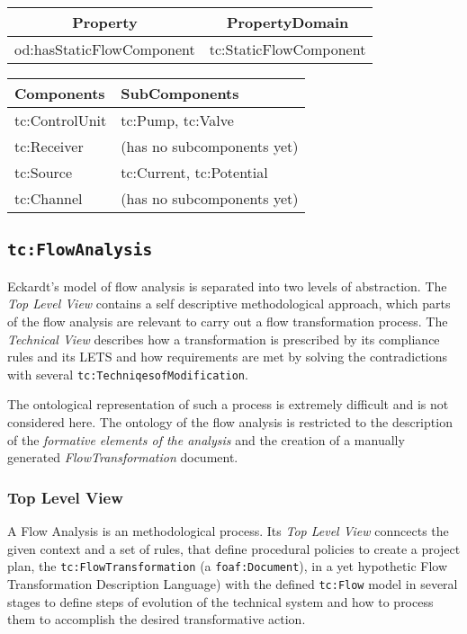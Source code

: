 \documentclass[a4paper,11pt]{article}
\begin{document}
\begin{itemize}
    \begin{center}
        \begin{tabular}{|c|c|}\hline
            Property & PropertyDomain \\\hline
            od:hasStaticFlowComponent & tc:StaticFlowComponent \\\hline 
        \end{tabular}
        \end{center}
    
        \begin{center}
        \begin{tabular}{|l|p{10cm}|}\hline
            Components & SubComponents \\\hline
            tc:ControlUnit & tc:Pump, tc:Valve \\
            tc:Receiver & (has no subcomponents yet) \\
            tc:Source & tc:Current, tc:Potential \\
            tc:Channel & (has no subcomponents yet)\\\hline 
        \end{tabular}
        \end{center}
    

    \subsection{\texttt{tc:FlowAnalysis}}
    Eckardt's model of flow analysis is separated into two levels of abstraction.
    The \emph{Top Level View} contains a self descriptive methodological approach,
    which parts of the flow analysis are relevant to carry out a flow transformation
    process. The \emph{Technical View} describes how a transformation is prescribed
    by its compliance rules and its LETS and how requirements are met by 
    solving the contradictions with several \texttt{tc:TechniqesofModification}. 

    The ontological representation of such a process is extremely difficult and is
    not considered here. The ontology of the flow analysis is restricted to the
    description of the \emph{formative elements of the analysis} and the creation
    of a manually generated \emph{FlowTransformation} document.

    \subsubsection{Top Level View}
    A Flow Analysis is an methodological process. Its \emph{Top Level View}
    conncects the given context and a set of rules, that define procedural policies
    to create a project plan, the \texttt{tc:FlowTransformation} (a 
    \texttt{foaf:Document}), in a yet hypothetic Flow Transformation Description
    Language) with the defined \texttt{tc:Flow} model in several stages to define 
    steps of evolution of the technical system and how to process them to accomplish
    the desired transformative action.


\end{itemize}
\end{document}
